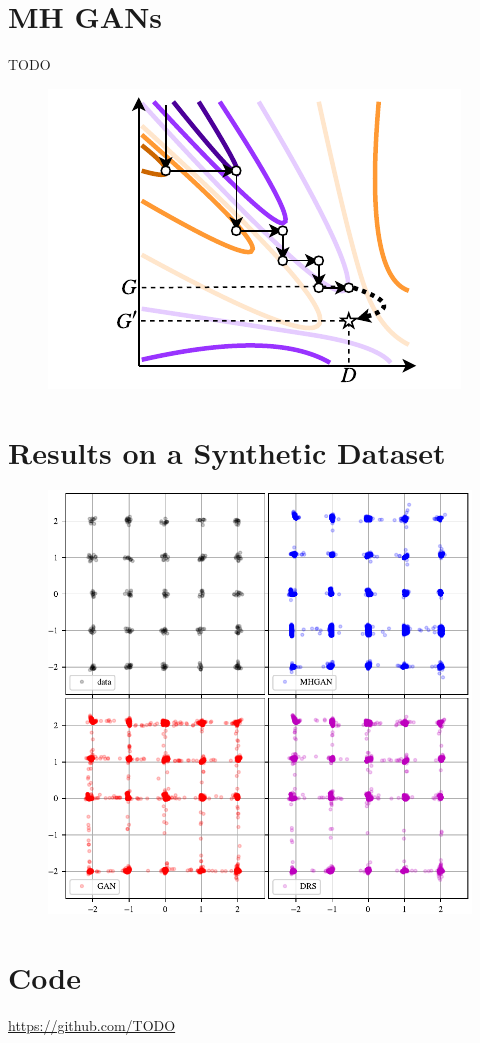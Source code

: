 \documentclass[a0,landscape]{a0poster}
\begin{document}
\begin{multicols}{3}
\section*{\fontsize{67.1}{82} \selectfont \color{NavyBlue} MH GANs \color{Black}}
TODO
\begin{figure}[H]
\centering
\includegraphics[width=.25\textwidth]{../figures/coord_descent.pdf}
\end{figure}

\section*{\fontsize{67.1}{82} \selectfont \color{NavyBlue} Results on a Synthetic Dataset \color{Black}}
\begin{figure}[H]
\centering
\includegraphics[width=.25\textwidth]{../figures/mog_example_150.pdf}
\end{figure}


\section*{\fontsize{67.1}{82} \selectfont \color{NavyBlue} Code \color{Black}}
\centering
\large {\url{https://github.com/TODO}}

\end{multicols}
\end{document}
